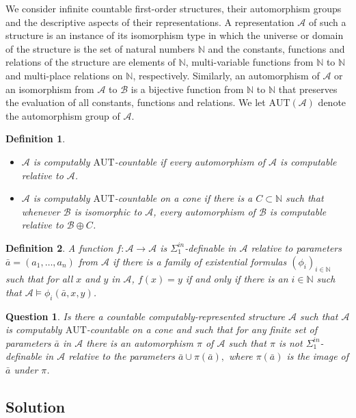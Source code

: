 \documentclass[12pt]{article}
\newcommand{\A}{\mathcal{A}}
\newcommand{\B}{\mathcal{B}}
\newcommand{\N}{\mathbb{N}}
\newcommand{\AUT}{\mathrm{AUT}}
\newtheorem{definition}{Definition}
\newtheorem{question}{Question}
\begin{document}
\date{}


We consider infinite countable first-order structures, their automorphism groups and the descriptive aspects of their representations. A representation $\A$ of such a structure is an instance of its isomorphism type in which the universe or domain of the structure is the set of natural numbers $\N$ and the constants, functions and relations of the structure are elements of $\N$, multi-variable functions from $\N$ to $\N$ and multi-place relations on $\N$, respectively.   Similarly, an automorphism of $\A$ or an isomorphism from $\A$ to $\B$ is a bijective function from $\N$ to $\N$ that preserves the evaluation of all constants, functions and relations.  We let $\AUT(\A)$ denote the automorphism group of $\A$.

\begin{definition}\label{1.1}
  \begin{itemize}
  \item     $\A$ is \emph{computably $\AUT$-countable} if every automorphism of $\A$ is computable relative to $\A$.  
  \item  $\A$ is \emph{computably $\AUT$-countable on a cone} if there is a $C\subset\N$ such that whenever $\B$ is isomorphic to $\A$, every automorphism of $\B$ is computable relative to $\B\oplus C$.
  \end{itemize}
\end{definition}


\begin{definition}
  A function $f:\A\to\A$ is \emph{$\Sigma^{in}_1$-definable} in $\A$ relative to parameters
  $\bar{a}=(a_1,\dots,a_n)$ from $\A$ if there is a family of existential formulas $(\phi_i)_{i\in\N}$ such that for all $x$ and $y$ in $\A$, $f(x)=y$ if and only if there is an $i\in\N$ such that $\A\models\phi_i(\bar{a},x,y)$.
\end{definition}

\begin{question}\label{sec:question}\label{1.2}
  Is there a countable computably-represented structure $\A$ such that $\A$ is computably $\AUT$-countable on a cone and such that for any finite  set of parameters $\bar{a}$ in $\A$ there is an automorphism $\pi$ of $\A$ such that $\pi$ is not $\Sigma^{in}_1$-definable in $\A$ relative to the parameters $\bar{a}\cup \pi(\bar{a}),$ where $\pi(\bar{a})$ is the image of $\bar{a}$ under $\pi$.
\end{question}

\subsection*{Solution}
\end{document}
